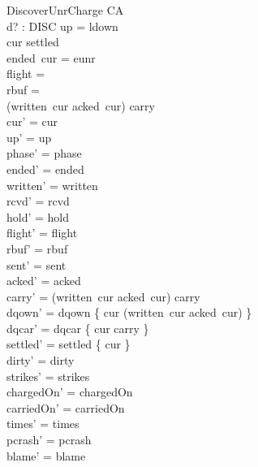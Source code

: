 \documentclass[a4paper,10pt,fleqn]{article}
\begin{document}
\begin{schema}{DiscoverUnrCharge}
  \Delta CA \\
  d? : DISC
\where
  up = ldown \\
  cur \notin settled \\
  ended~cur = eunr \\
  flight = \emptyset \\
  rbuf = \emptyset \\
  (written~cur \setminus acked~cur) \cup carry \neq \emptyset \\
  cur' = cur \\
  up' = up \\
  phase' = phase \\
  ended' = ended \\
  written' = written \\
  rcvd' = rcvd \\
  hold' = hold \\
  flight' = flight \\
  rbuf' = rbuf \\
  sent' = sent \\
  acked' = acked \\
  carry' = (written~cur \setminus acked~cur) \cup carry \\
  dqown' = dqown \cup \{ cur \mapsto (written~cur \setminus acked~cur) \} \\
  dqcar' = dqcar \cup \{ cur \mapsto carry \} \\
  settled' = settled \cup \{ cur \} \\
  dirty' = dirty \\
  strikes' = strikes \\
  chargedOn' = chargedOn \\
  carriedOn' = carriedOn \\
  times' = times \\
  pcrash' = pcrash \\
  blame' = blame
\end{schema}
\end{document}

